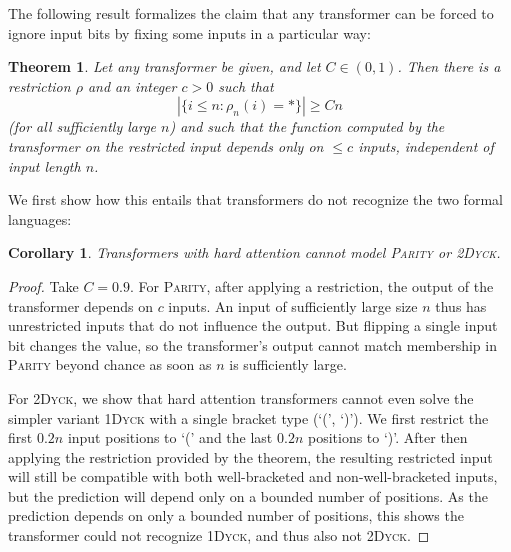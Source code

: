 \documentclass[11pt,a4paper]{article}
\newcounter{theorem}
\newtheorem{corollary}[theorem]{Corollary}
\newtheorem{thm}[theorem]{Theorem}
\begin{document}
The following result formalizes the claim that any transformer can be forced to ignore input bits by fixing some inputs in a particular way:
\begin{thm}\label{thm:hardmax-main}
Let any transformer be given, and let $C \in (0,1)$.
Then there is a restriction $\rho$ and an integer $c > 0$ such that 
$$|\{i \leq n: \rho_n(i) = *\}| \geq Cn$$
(for all sufficiently large $n$) and such that the function computed by the transformer on the restricted input depends only on $\leq c$ inputs, independent of input length $n$.
\end{thm}
We first show how this entails that transformers do not recognize the two formal languages:
\begin{corollary}
Transformers with hard attention cannot model \textsc{Parity} or \textsc{2Dyck}. %
\end{corollary}
\begin{proof}
Take $C=0.9$.
For \textsc{Parity}, after applying a restriction, the output of the transformer depends on $c$ inputs.
An input of sufficiently large size $n$ thus has unrestricted inputs that do not influence the output.
But flipping a single input bit changes the value, so the transformer's output cannot match membership in \textsc{Parity} beyond chance as soon as $n$ is sufficiently large.


For \textsc{2Dyck}, we show that hard attention transformers cannot even solve the simpler variant \textsc{1Dyck} with a single bracket type (`(', `)').
We first restrict the first $0.2n$ input positions to `(' and the last $0.2n$ positions to `)'.
After then applying the restriction provided by the theorem, the resulting restricted input will still be compatible with both well-bracketed and non-well-bracketed inputs, but the prediction will depend only on a bounded number of positions.
As the prediction depends on only a bounded number of positions, this shows the transformer could not recognize \textsc{1Dyck}, and thus also not \textsc{2Dyck}.
%
\end{proof}
\end{document}
